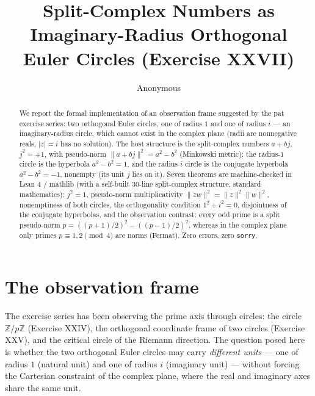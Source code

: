 \documentclass[sigplan,10pt,anonymous,review]{acmart}
\begin{document}
\title{Split-Complex Numbers as Imaginary-Radius Orthogonal Euler
Circles (Exercise XXVII)}

\author{Anonymous}

\begin{abstract}
We report the formal implementation of an observation frame suggested by
the pat exercise series: two orthogonal Euler circles, one of radius $1$
and one of radius $i$ --- an imaginary-radius circle, which cannot exist
in the complex plane (radii are nonnegative reals, $|z| = i$ has no
solution). The host structure is the split-complex numbers
$a + bj$, $j^2 = +1$, with pseudo-norm $\|a + bj\|^2 = a^2 - b^2$
(Minkowski metric): the radius-$1$ circle is the hyperbola
$a^2 - b^2 = 1$, and the radius-$i$ circle is the conjugate hyperbola
$a^2 - b^2 = -1$, nonempty (its unit $j$ lies on it). Seven theorems are
machine-checked in Lean 4 / mathlib (with a self-built 30-line
split-complex structure, standard mathematics): $j^2 = 1$,
pseudo-norm multiplicativity $\|zw\|^2 = \|z\|^2\|w\|^2$, nonemptiness
of both circles, the orthogonality condition $1^2 + i^2 = 0$, disjointness
of the conjugate hyperbolas, and the observation contrast: every odd
prime is a split pseudo-norm $p = ((p+1)/2)^2 - ((p-1)/2)^2$, whereas in
the complex plane only primes $p \equiv 1, 2 \pmod 4$ are norms (Fermat).
Zero errors, zero \texttt{sorry}.
\end{abstract}


\maketitle

\section{The observation frame}

The exercise series has been observing the prime axis through circles:
the circle $\mathbb{Z}/p\mathbb{Z}$ (Exercise XXIV), the orthogonal
coordinate frame of two circles (Exercise XXV), and the critical circle
of the Riemann direction. The question posed here is whether the two
orthogonal Euler circles may carry \emph{different units} --- one of
radius $1$ (natural unit) and one of radius $i$ (imaginary unit) ---
without forcing the Cartesian constraint of the complex plane, where the
real and imaginary axes share the same unit.
\end{document}
